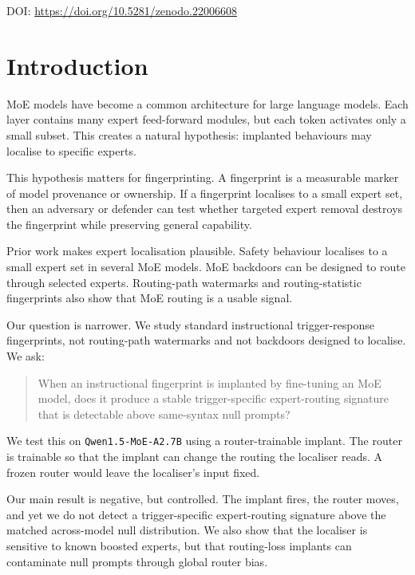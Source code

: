 \documentclass[
  11pt,
  a4paper,
]{article}
\begin{document}
\vspace{-0.6em}
\noindent\small DOI: \url{https://doi.org/10.5281/zenodo.22006608}
\vspace{0.4em}

\section{Introduction}\label{introduction}

MoE models have become a common architecture for large language models.
Each layer contains many expert feed-forward modules, but each token
activates only a small subset. This creates a natural hypothesis:
implanted behaviours may localise to specific experts.

This hypothesis matters for fingerprinting. A fingerprint is a
measurable marker of model provenance or ownership. If a fingerprint
localises to a small expert set, then an adversary or defender can test
whether targeted expert removal destroys the fingerprint while
preserving general capability.

Prior work makes expert localisation plausible. Safety behaviour
localises to a small expert set in several MoE models. MoE backdoors can
be designed to route through selected experts. Routing-path watermarks
and routing-statistic fingerprints also show that MoE routing is a
usable signal.

Our question is narrower. We study standard instructional
trigger-response fingerprints, not routing-path watermarks and not
backdoors designed to localise. We ask:

\begin{quote}
When an instructional fingerprint is implanted by fine-tuning an MoE
model, does it produce a stable trigger-specific expert-routing
signature that is detectable above same-syntax null prompts?
\end{quote}

We test this on \texttt{Qwen1.5-MoE-A2.7B} using a router-trainable
implant. The router is trainable so that the implant can change the
routing the localiser reads. A frozen router would leave the localiser's
input fixed.

Our main result is negative, but controlled. The implant fires, the
router moves, and yet we do not detect a trigger-specific expert-routing
signature above the matched across-model null distribution. We also show
that the localiser is sensitive to known boosted experts, but that
routing-loss implants can contaminate null prompts through global router
bias.
\end{document}
